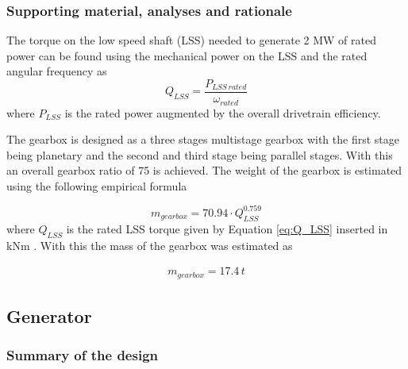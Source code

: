 \subsubsection{Supporting material, analyses and rationale}

The torque on the low speed shaft (LSS) needed to generate 2 MW of rated power can be found using the mechanical power on the LSS and the rated angular frequency as
\begin{equation}
    Q_{LSS} = \dfrac{P_{LSS\, rated}}{\omega_{rated}}
    \label{eq:Q_LSS}
\end{equation}
where $P_{LSS}$ is the rated power augmented by the overall drivetrain efficiency. 

The gearbox is designed as a three stages multistage gearbox with the first stage being planetary and the second and third stage being parallel stages. With this an overall gearbox ratio of 75 is achieved. 
The weight of the gearbox is estimated using the following empirical formula

\begin{equation}
    m_{gearbox} = 70.94 \cdot Q_{LSS}^{0.759}
\end{equation}
where $Q_{LSS}$ is the rated LSS torque given by Equation \ref{eq:Q_LSS} inserted in kNm \cite{Fingersh2006}. With this the mass of the gearbox was estimated as

\begin{align}
m_{gearbox} = 17.4 \, t
\end{align}


\subsection{Generator}

\subsubsection{Summary of the design}

